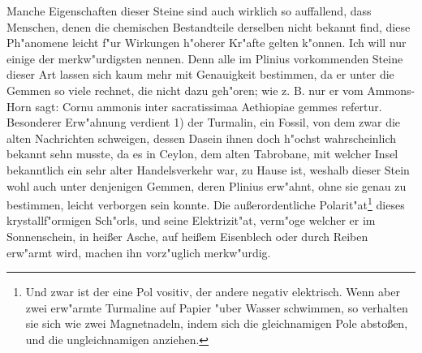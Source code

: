 \documentclass[a4paper, 11pt, oneside, polutonikogreek, german]{article}
\begin{document}
Manche Eigenschaften dieser Steine sind auch wirklich so auffallend, dass Menschen, denen die chemischen Bestandteile derselben nicht bekannt find, diese Ph"anomene leicht f"ur Wirkungen h"oherer Kr"afte gelten k"onnen. Ich will nur einige der merkw"urdigsten nennen. Denn alle im Plinius vorkommenden Steine dieser Art lassen sich kaum mehr mit Genauigkeit bestimmen, da er unter die Gemmen so viele rechnet, die nicht dazu geh"oren; wie z. B. nur er vom Ammons-Horn sagt: Cornu ammonis inter sacratissimaa Aethiopiae gemmes refertur. Besonderer Erw"ahnung verdient 1) der Turmalin, ein Fossil, von dem zwar die alten Nachrichten schweigen, dessen Dasein ihnen doch h"ochst wahrscheinlich bekannt sehn musste, da es in Ceylon, dem alten Tabrobane, mit welcher Insel bekanntlich ein sehr alter Handelsverkehr war, zu Hause ist, weshalb dieser Stein wohl auch unter denjenigen Gemmen, deren Plinius erw"ahnt, ohne sie genau zu bestimmen, leicht verborgen sein konnte. Die außerordentliche Polarit"at\footnote{Und zwar ist der eine Pol vositiv, der andere negativ elektrisch. Wenn aber zwei erw"armte Turmaline auf Papier "uber Wasser schwimmen, so verhalten sie sich wie zwei Magnetnadeln, indem sich die gleichnamigen Pole abstoßen, und die ungleichnamigen anziehen.} dieses krystallf"ormigen Sch"orls, und seine Elektrizit"at, verm"oge welcher er im Sonnenschein, in heißer Asche, auf heißem Eisenblech oder durch Reiben erw"armt wird, machen ihn vorz"uglich merkw"urdig.
\end{document}
